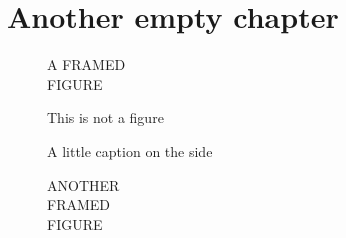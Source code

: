 \documentclass[
    10pt,
    twoside,
    smallroyalvopaper,
]{memoir}
\begin{document}
\chapter{Another empty chapter}

\begin{figure}\centering
    \begin{framed}
        A FRAMED\\
        FIGURE
    \end{framed}
    \caption{This is not a figure}
\end{figure}

\begin{figure}\centering
    \begin{sidecaption}{A little caption on the side}
        \begin{framed}
            ANOTHER\\
            FRAMED\\
            FIGURE
        \end{framed}
    \end{sidecaption}
\end{figure}


\backmatter
\end{document}
